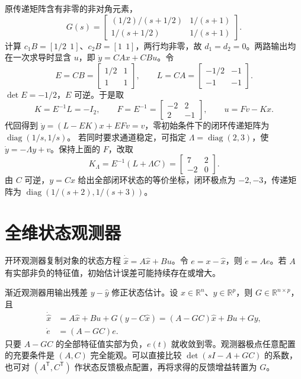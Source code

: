 
\sol 原传递矩阵含有非零的非对角元素，
\[
    G(s)=\begin{bmatrix}
        (1/2)/(s+1/2)&1/(s+1)\\
        1/(s+1/2)&1/(s+1)
    \end{bmatrix}.
\]
计算 $c_1B=[1/2\ \ 1]$、$c_2B=[1\ \ 1]$，两行均非零，故 $d_1=d_2=0$。两路输出均在一次求导时显含 $u$，即 $\dot y=CAx+CBu$。令
\[
    E=CB=\begin{bmatrix}1/2&1\\1&1\end{bmatrix},\qquad
    L=CA=\begin{bmatrix}-1/2&-1\\-1&-1\end{bmatrix}.
\]
$\det E=-1/2$，$E$ 可逆。于是取
\[
    K=E^{-1}L=-I_2,\qquad F=E^{-1}=\begin{bmatrix}-2&2\\2&-1\end{bmatrix},
    \qquad u=Fv-Kx .
\]
代回得到 $\dot y=(L-EK)x+EFv=v$，零初始条件下的闭环传递矩阵为 $\operatorname{diag}(1/s,1/s)$。
若同时要求通道稳定，可指定 $\Lambda=\operatorname{diag}(2,3)$，使 $\dot y=-\Lambda y+v$。保持上面的 $F$，改取
\[
    K_\Lambda=E^{-1}(L+\Lambda C)
             =\begin{bmatrix}7&2\\-2&0\end{bmatrix}.
\]
由 $C$ 可逆，$y=Cx$ 给出全部闭环状态的等价坐标，闭环极点为 $-2,-3$，传递矩阵为 $\operatorname{diag}(1/(s+2),1/(s+3))$。

\section{全维状态观测器}

开环观测器复制对象的状态方程 $\dot{\hat x}=A\hat x+Bu$。令 $e=x-\hat x$，则 $\dot e=Ae$。若 $A$ 有实部非负的特征值，初始估计误差可能持续存在或增大。

渐近观测器用输出残差 $y-\hat y$ 修正状态估计。设 $x\in\mathbb R^n$、$y\in\mathbb R^p$，则 $G\in\mathbb R^{n\times p}$，且
\[
\begin{aligned}
    \dot{\hat x}
    &=A\hat x+Bu+G(y-C\hat x)
      =(A-GC)\hat x+Bu+Gy,\\
    \dot e&=(A-GC)e .
\end{aligned}
\]
只要 $A-GC$ 的全部特征值实部为负，$e(t)$ 就收敛到零。观测器极点任意配置的充要条件是 $(A,C)$ 完全能观。可以直接比较 $\det(sI-A+GC)$ 的系数，也可对 $(A^{\mathsf T},C^{\mathsf T})$ 作状态反馈极点配置，再将求得的反馈增益转置为 $G$。

